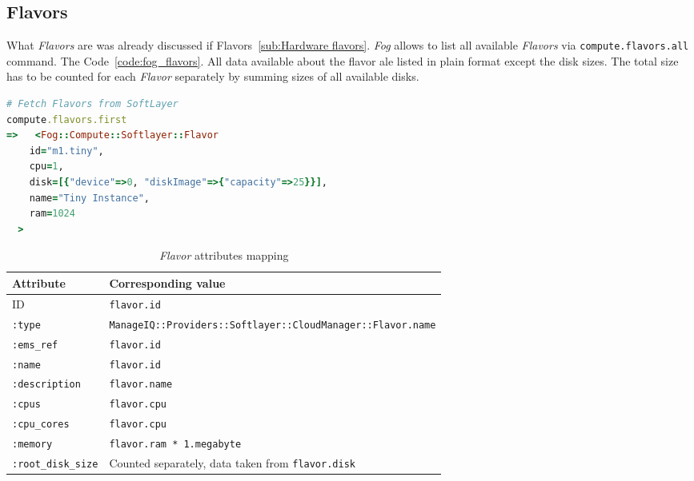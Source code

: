 \subsection{Flavors}
\label{sub:Flavors}

What \emph{Flavors} are was already discussed if Flavors~\ref{sub:Hardware flavors}. \emph{Fog} allows to list all available \emph{Flavors} via \texttt{compute.flavors.all} command. The Code~\ref{code:fog_flavors}. All data available about the flavor ale listed in plain format except the disk sizes. The total size has to be counted for each \emph{Flavor} separately by summing sizes of all available disks.

\begin{lstlisting}[language=Ruby,caption={Sample of \emph{Flavors} data},label=code:fog_flavors,float=htpb]
# Fetch Flavors from SoftLayer
compute.flavors.first
=>   <Fog::Compute::Softlayer::Flavor
    id="m1.tiny",
    cpu=1,
    disk=[{"device"=>0, "diskImage"=>{"capacity"=>25}}],
    name="Tiny Instance",
    ram=1024
  >
\end{lstlisting}

\begin{table}[ht]
	\centering
	\caption{\emph{Flavor} attributes mapping}\label{tab:Flavor attributes mapping}
	\begin{tabular}{ll}
		\toprule
		Attribute                  & Corresponding value                                                      \\
		\midrule
		ID                         & \texttt{flavor.id}                                                       \\
		\texttt{:type}             & \small\texttt{ManageIQ::Providers::Softlayer::CloudManager::Flavor.name} \\
		\texttt{:ems\_ref}         & \texttt{flavor.id}                                                       \\
		\texttt{:name}             & \texttt{flavor.id}                                                       \\
		\texttt{:description}      & \texttt{flavor.name}                                                     \\
		\texttt{:cpus}             & \texttt{flavor.cpu}                                                      \\
		\texttt{:cpu\_cores}       & \texttt{flavor.cpu}                                                      \\
		\texttt{:memory}           & \texttt{flavor.ram * 1.megabyte}                                         \\
		\texttt{:root\_disk\_size} & Counted separately, data taken from \texttt{flavor.disk}                 \\
		\bottomrule
	\end{tabular}
\end{table}

